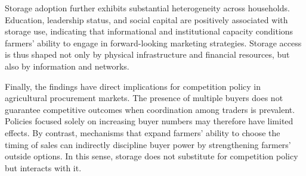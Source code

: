 Storage adoption further exhibits substantial heterogeneity across households. Education, leadership status, and social capital are positively associated with storage use, indicating that informational and institutional capacity conditions farmers' ability to engage in forward-looking marketing strategies. Storage access is thus shaped not only by physical infrastructure and financial resources, but also by information and networks.

Finally, the findings have direct implications for competition policy in agricultural procurement markets. The presence of multiple buyers does not guarantee competitive outcomes when coordination among traders is prevalent. Policies focused solely on increasing buyer numbers may therefore have limited effects. By contrast, mechanisms that expand farmers' ability to choose the timing of sales can indirectly discipline buyer power by strengthening farmers' outside options. In this sense, storage does not substitute for competition policy but interacts with it.